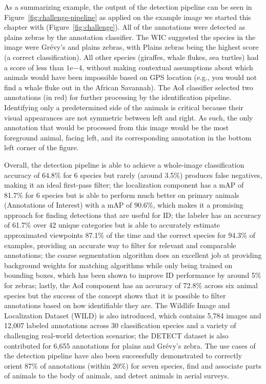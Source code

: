 As a summarizing example, the output of the detection pipeline can be seen in Figure~\ref{fig:challenge-pipeline} as applied on the example image we started this chapter with (Figure~\ref{fig:challenge}).  All of the annotations were detected as plains zebras by the annotation classifier.  The WIC suggested the species in the image were Gr\'evy's and plains zebras, with Plains zebras being the highest score (a correct classification).  All other species (giraffes, whale flukes, sea turtles) had a score of less than $1\mathrm{e}{-4}$, without making contextual assumptions about which animals would have been impossible based on GPS location (e.g., you would not find a whale fluke out in the African Savannah).  The AoI classifier selected two annotations (in red) for further processing by the identification pipeline.  Identifying only a predetermined side of the animals is critical because their visual appearances are not symmetric between left and right.  As such, the only annotation that would be processed from this image would be the most foreground animal, facing left, and its corresponding annotation in the bottom left corner of the figure.

Overall, the detection pipeline is able to achieve a whole-image classification accuracy of 64.8\% for 6 species but rarely (around 3.5\%) produces false negatives, making it an ideal first-pass filter; the localization component has a mAP of 81.7\% for 6 species but is able to perform much better on primary animals (Annotations of Interest) with a mAP of 90.6\%, which makes it a promising approach for finding detections that are useful for ID; the labeler has an accuracy of 61.7\% over 42 unique categories but is able to accurately estimate approximated viewpoints 87.1\% of the time and the correct species for 94.3\% of examples, providing an accurate way to filter for relevant and comparable annotations; the coarse segmentation algorithm does an excellent job at providing background weights for matching algorithms while only being trained on bounding boxes, which has been shown to improve ID performance by around 5\% for zebras; lastly, the AoI component has an accuracy of 72.8\% across six animal species but the success of the concept shows that it is possible to filter annotations based on how identifiable they are.  The Wildlife Image and Localization Dataset (WILD) is also introduced, which contains 5,784 images and 12,007 labeled annotations across 30 classification species and a variety of challenging real-world detection scenarios; the DETECT dataset is also contributed for 6,655 annotations for plains and Gr\'evy's zebra.  The use cases of the detection pipeline have also been successfully demonstrated to correctly orient 87\% of annotations (within 20\%) for seven species, find and associate parts of animals to the body of animals, and detect animals in aerial surveys.

